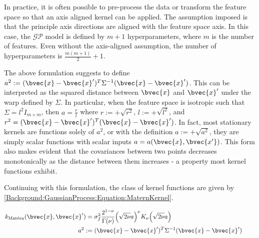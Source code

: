				In practice, it is often possible to pre-process the data or transform the feature space so that an axis aligned kernel can be applied. The assumption imposed is that the principle axis directions are aligned with the feature space axis. In this case, the $\mathcal{GP}$ model is defined by $m + 1$ hyperparameters, where $m$ is the number of features. Even without the axis-aligned assumption, the number of hyperparameters is $\frac{m(m + 1)}{2} + 1$.
				
				The above formulation suggests to define $a^{2} := (\bvec{x} - \bvec{x}')^{T} \Sigma^{-1} (\bvec{x} - \bvec{x}')$. This can be interpreted as the squared distance between $\bvec{x}$ and $\bvec{x}'$ under the warp defined by $\Sigma$. In particular, when the feature space is isotropic such that $\Sigma = l^{2} I_{m \times m}$, then $a = \frac{r}{l}$ where $r := +\sqrt{r^{2}}$, $l := +\sqrt{l^{2}}$, and $r^{2} = (\bvec{x} - \bvec{x}')^{T} (\bvec{x} - \bvec{x}')$. In fact, most stationary kernels are functions solely of $a^{2}$, or with the definition $a := +\sqrt{a^{2}}$, they are simply scalar functions with scalar inputs $a = a (\bvec{x}, \bvec{x'})$. This form also makes evident that the covariances between two points decreases monotonically as the distance between them increases - a property most kernel functions exhibit.
				
				Continuing with this formulation, the \matern class of kernel functions are given by \eqref{Background:GaussianProcess:Equation:MaternKernel}.
				
				\begin{equation}
					\left.
						\begin{aligned}
							k_{\mathrm{\maternmath}}(\bvec{x}, \bvec{x}') =& \; \sigma_{f}^{2} \frac{2^{1 - \nu}}{\Gamma(\nu)} \Big( \sqrt{2 \nu} a \Big)^{\nu} K_{\nu}\Big( \sqrt{2 \nu} a \Big) \\
							a^{2} :=& \; (\bvec{x} - \bvec{x}')^{T} \Sigma^{-1} (\bvec{x} - \bvec{x}')
						\end{aligned}
					\qquad \right.
				\label{Background:GaussianProcess:Equation:MaternKernel}
				\end{equation}
							
